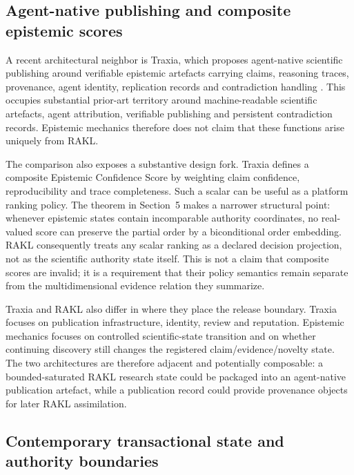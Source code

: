 \documentclass[11pt]{article}
\begin{document}
\subsection{Agent-native publishing and composite epistemic scores}

A recent architectural neighbor is Traxia, which proposes agent-native scientific publishing around verifiable epistemic artefacts carrying claims, reasoning traces, provenance, agent identity, replication records and contradiction handling \cite{dogah2026traxia}. This occupies substantial prior-art territory around machine-readable scientific artefacts, agent attribution, verifiable publishing and persistent contradiction records. Epistemic mechanics therefore does not claim that these functions arise uniquely from RAKL.

The comparison also exposes a substantive design fork. Traxia defines a composite Epistemic Confidence Score by weighting claim confidence, reproducibility and trace completeness. Such a scalar can be useful as a platform ranking policy. The theorem in Section~5 makes a narrower structural point: whenever epistemic states contain incomparable authority coordinates, no real-valued score can preserve the partial order by a biconditional order embedding. RAKL consequently treats any scalar ranking as a declared decision projection, not as the scientific authority state itself. This is not a claim that composite scores are invalid; it is a requirement that their policy semantics remain separate from the multidimensional evidence relation they summarize.

Traxia and RAKL also differ in where they place the release boundary. Traxia focuses on publication infrastructure, identity, review and reputation. Epistemic mechanics focuses on controlled scientific-state transition and on whether continuing discovery still changes the registered claim/evidence/novelty state. The two architectures are therefore adjacent and potentially composable: a bounded-saturated RAKL research state could be packaged into an agent-native publication artefact, while a publication record could provide provenance objects for later RAKL assimilation.

\subsection{Contemporary transactional state and authority boundaries}
\end{document}
